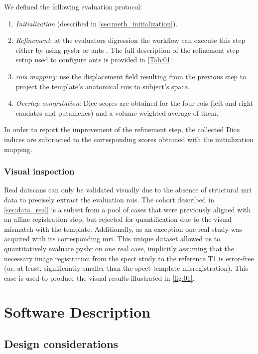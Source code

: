 \documentclass{frontiers}
\newcommand{\emitem}[1]{\item \emph{#1}}
\begin{document}
  
We defined the following evaluation protocol:
\begin{enumerate}
\emitem{Initialization} (described in \autoref{sec:meth_initialization}).
\emitem{Refinement}: at the evaluators digression the workflow can execute 
  this step either by using  \gls*{pysbr} or \gls*{ants} .
  The full description of the refinement step setup used to configure
  \gls*{ants} is provided in \autoref{Tab:01}.
\emitem{\Glspl{roi} mapping}: use the displacement field resulting from
  the previous step to project the template's anatomical \glspl*{roi} to
  subject's space.
\emitem{Overlap computation}: Dice scores are obtained for the four
  \glspl*{roi} (left and right caudates and putamenes) and a
  volume-weighted average of them.
\end{enumerate}

In order to report the improvement of the refinement step,
  the collected Dice indices are subtracted to the corresponding
  scores obtained with the initialization mapping.
  
\subsubsection{Visual inspection}

Real \glspl*{datscan} can only be validated visually due to the 
  absence of structural \gls*{mri} data to precisely extract
  the evaluation \glspl*{roi}.
The cohort described in \autoref{sec:data_real}
  is a subset from a pool of cases that were previously aligned with an
  affine registration step, but rejected for quantification due to the
  visual mismatch with the template.
Additionally, as an exception one real study was acquired with its
  corresponding \gls*{mri}.
This unique dataset allowed us to quantitatively evaluate \gls*{pysbr} on one real case,
  implicitly assuming that the necessary image registration from the 
  \gls*{spect} study to the reference T1 is error-free 
  (or, at least, significantly smaller than the \gls*{spect}-template misregistration).
This case is used to produce the visual results illustrated in \autoref{fig:01}.

\section{Software Description}
\label{sec:software}
\subsection{Design considerations}
\label{sec:design}
\end{document}
